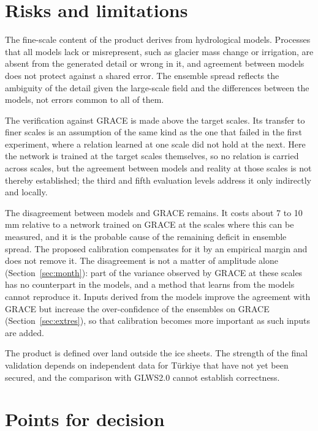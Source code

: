 \documentclass[11pt,a4paper]{article}
\begin{document}
\section{Risks and limitations}

The fine-scale content of the product derives from hydrological models. Processes that all
models lack or misrepresent, such as glacier mass change or irrigation, are absent from the
generated detail or wrong in it, and agreement between models does not protect against a
shared error. The ensemble spread reflects the ambiguity of the detail given the large-scale
field and the differences between the models, not errors common to all of them.

The verification against GRACE is made above the target scales. Its transfer to finer scales
is an assumption of the same kind as the one that failed in the first experiment, where a
relation learned at one scale did not hold at the next. Here the network is trained at the
target scales themselves, so no relation is carried across scales, but the agreement between
models and reality at those scales is not thereby established; the third and fifth evaluation
levels address it only indirectly and locally.

The disagreement between models and GRACE remains. It costs about 7 to 10\,mm relative to a
network trained on GRACE at the scales where this can be measured, and it is the probable
cause of the remaining deficit in ensemble spread. The proposed calibration compensates for it
by an empirical margin and does not remove it. The disagreement is not a matter of amplitude
alone (Section~\ref{sec:month}): part of the variance observed by GRACE at these scales has no
counterpart in the models, and a method that learns from the models cannot reproduce it.
Inputs derived from the models improve the agreement with GRACE but increase the
over-confidence of the ensembles on GRACE (Section~\ref{sec:extres}), so that calibration
becomes more important as such inputs are added.

The product is defined over land outside the ice sheets. The strength of the final validation
depends on independent data for Türkiye that have not yet been secured, and the comparison
with GLWS2.0 cannot establish correctness.

\section{Points for decision}\label{sec:decide}
\end{document}
